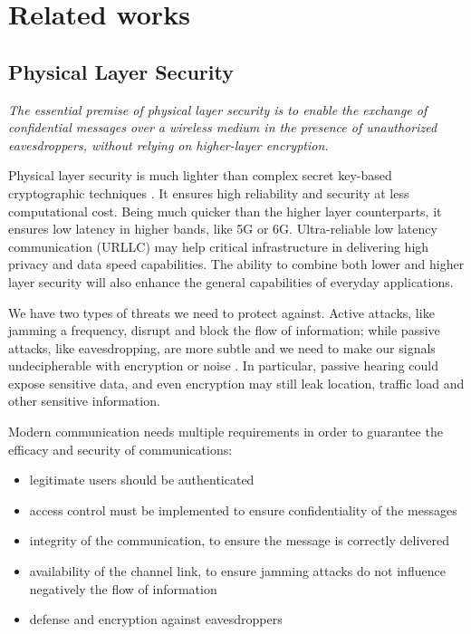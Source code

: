 \newpage
\section{Related works}
\subsection{Physical Layer Security}

\textit{The essential premise of physical layer security is to enable the exchange of confidential messages over a wireless medium in the presence of unauthorized eavesdroppers, without relying on higher-layer encryption.}\cite{6739367}

Physical layer security is much lighter than complex secret key-based cryptographic techniques \cite{10599431}. It ensures high reliability and security at less computational cost. Being much quicker than the higher layer counterparts, it ensures low latency in higher bands, like 5G or 6G. Ultra-reliable low latency communication (URLLC) may help critical infrastructure in delivering high privacy and data speed capabilities. The ability to combine both lower and higher layer security will also enhance the general capabilities of everyday applications.

We have two types of threats we need to protect against. Active attacks, like jamming a frequency, disrupt and block the flow of information; while passive attacks, like eavesdropping, are more subtle and we need to make our signals undecipherable with encryption or noise \cite{5751298}. In particular, passive hearing could expose sensitive data, and even encryption may still leak location, traffic load and other sensitive information.

Modern communication needs multiple requirements in order to guarantee the efficacy and security of communications:
\begin{itemize}
  \item legitimate users should be authenticated
  \item access control must be implemented to ensure confidentiality of the messages
  \item integrity of the communication, to ensure the message is correctly delivered
  \item availability of the channel link, to ensure jamming attacks do not influence negatively the flow of information
  \item defense and encryption against eavesdroppers
\end{itemize}

